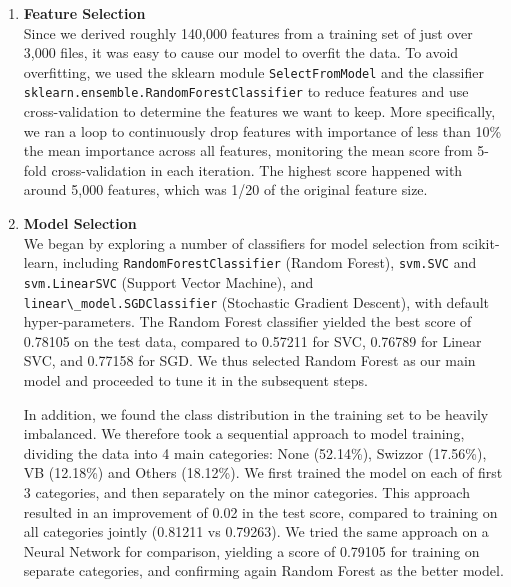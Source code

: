 \documentclass[11pt]{article}
\begin{document}
\begin{enumerate}
\item \textbf{Feature Selection}\\
Since we derived roughly 140,000 features from a training set of just over 3,000 files, it was easy to cause our model to overfit the data. To avoid overfitting, we used the sklearn module \verb|SelectFromModel| and the classifier \verb|sklearn.ensemble.RandomForestClassifier| to reduce features and use cross-validation to determine the features we want to keep. More specifically, we ran a loop to continuously drop features with importance of less than 10\% the mean importance across all features, monitoring the mean score from 5-fold cross-validation in each iteration. The highest score happened with around 5,000 features, which was 1/20 of the original feature size.

\item\textbf{Model Selection}\\
We began by exploring a number of classifiers for model selection from scikit-learn, including \verb|RandomForestClassifier| (Random Forest), \verb|svm.SVC| and \verb|svm.LinearSVC| (Support Vector Machine), and \verb|linear\_model.SGDClassifier| (Stochastic Gradient Descent), with default hyper-parameters. The Random Forest classifier yielded the best score of 0.78105 on the test data, compared to 0.57211 for SVC, 0.76789 for Linear SVC, and 0.77158 for SGD. We thus selected Random Forest as our main model and proceeded to tune it in the subsequent steps.

In addition, we found the class distribution in the training set to be heavily imbalanced. We therefore took a sequential approach to model training, dividing the data into 4 main categories: None (52.14\%), Swizzor (17.56\%), VB (12.18\%) and Others (18.12\%). We first trained the model on each of first 3 categories, and then separately on the minor categories. This approach resulted in an improvement of 0.02 in the test score, compared to training on all categories jointly (0.81211 vs 0.79263). We tried the same approach on a Neural Network for comparison, yielding a score of 0.79105 for training on separate categories, and confirming again Random Forest as the better model.


\end{enumerate}
\end{document}
